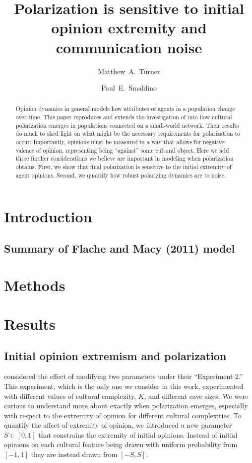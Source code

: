\documentclass[11pt,letterpaper]{article}
\title{Polarization is sensitive to initial opinion extremity and communication noise}
\author[1]{Matthew~A.~Turner}
\author[1]{Paul~E.~Smaldino}
\affil[1]{\footnotesize Cognitive Science Program, University of California, Merced}
\date{}
\begin{document}
\maketitle

\begin{abstract}
  Opinion dynamics in general models how attributes of agents in a population
  change over time. This paper reproduces and extends the investigation of
   into how cultural polarization emerges in populations
  connected on a small-world network. Their results do much to shed light
  on what might be the necessary requirements for polarization to occur.
  Importantly, opinions must be measured in a way that allows for negative
  valence of opinion, representing being ``against'' some cultural object.
  Here we add three further considerations we believe are important in 
  modeling when polarization obtains. First, we show that final polarization
  is sensitive to the initial extremity of agent opinions. Second, we quantify
  how robust polarizing dynamics are to noise. 
\end{abstract}

\section{Introduction}

\subsection{Summary of Flache and Macy (2011) model}

\section{Methods}
\label{sec:methods}

\section{Results}

\subsection{Initial opinion extremism and polarization}

 considered the effect of modifying two parameters under their
``Experiment 2.'' This experiment, which is the only one we consider in this
work, experimented with different values of cultural complexity, $K$, and 
different cave sizes. We were curious to understand more about exactly when
polarization emerges, especially with respect to the extremity of opinion
for different cultural complexities. To quantify the affect of extremity of
opinion, we introduced a new parameter $S \in [0, 1]$ that constrains the
extremity of initial opinions. Instead of initial opinions on each
cultural feature being drawn with uniform probability from $[-1, 1]$ they are
instead drawn from $[-S, S]$. 
\end{document}
